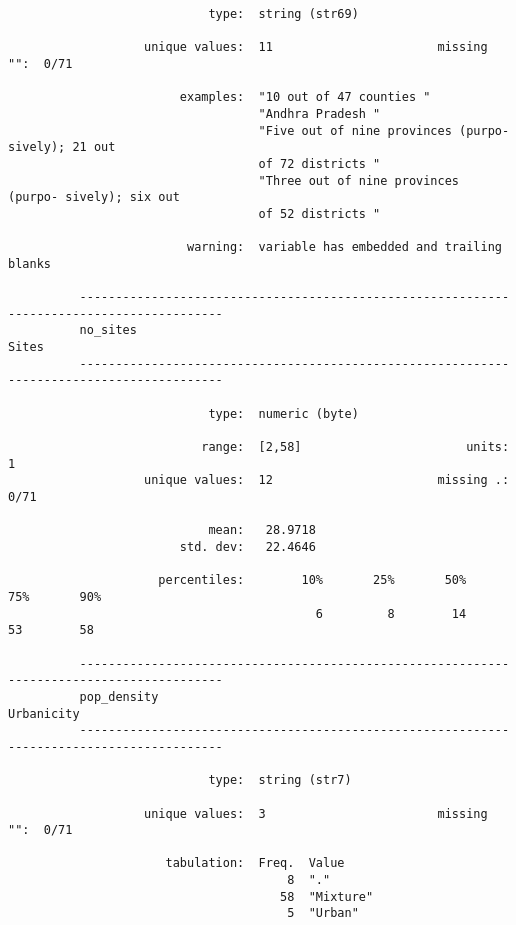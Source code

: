 \documentclass{article}
\begin{document}
\begin{verbatim}
                            type:  string (str69)
          
                   unique values:  11                       missing "":  0/71
          
                        examples:  "10 out of 47 counties "
                                   "Andhra Pradesh "
                                   "Five out of nine provinces (purpo- sively); 21 out
                                   of 72 districts "
                                   "Three out of nine provinces (purpo- sively); six out
                                   of 52 districts "
          
                         warning:  variable has embedded and trailing blanks
          
          ------------------------------------------------------------------------------------------
          no_sites                                                                             Sites
          ------------------------------------------------------------------------------------------
          
                            type:  numeric (byte)
          
                           range:  [2,58]                       units:  1
                   unique values:  12                       missing .:  0/71
          
                            mean:   28.9718
                        std. dev:   22.4646
          
                     percentiles:        10%       25%       50%       75%       90%
                                           6         8        14        53        58
          
          ------------------------------------------------------------------------------------------
          pop_density                                                                     Urbanicity
          ------------------------------------------------------------------------------------------
          
                            type:  string (str7)
          
                   unique values:  3                        missing "":  0/71
          
                      tabulation:  Freq.  Value
                                       8  "."
                                      58  "Mixture"
                                       5  "Urban"
          

\end{verbatim}
\end{document}
